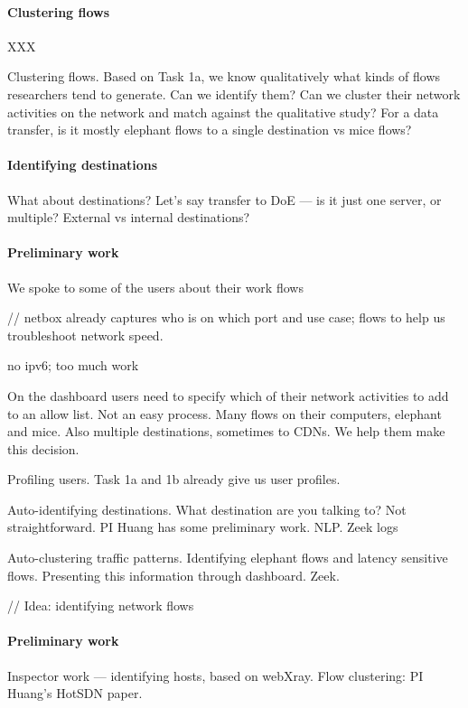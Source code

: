 \paragraph{Clustering flows} XXX

Clustering flows. Based on Task 1a, we know qualitatively what kinds of flows researchers tend to generate. Can we identify them? Can we cluster their network activities on the network and match against the qualitative study? For a data transfer, is it mostly elephant flows to a single destination vs mice flows?

\paragraph{Identifying destinations}
What about destinations? Let's say transfer to DoE — is it just one server, or multiple? External vs internal destinations?

\paragraph{Preliminary work} We spoke to some of the users about their work flows

// netbox already captures who is on which port and use case; flows to help us troubleshoot network speed.

no ipv6; too much work




On the dashboard users need to specify which of their network activities to add to an allow list. Not an easy process. Many flows on their computers, elephant and mice. Also multiple destinations, sometimes to CDNs. We help them make this decision.

Profiling users. Task 1a and 1b already give us user profiles.

Auto-identifying destinations. What destination are you talking to? Not straightforward. PI Huang has some preliminary work. NLP. Zeek logs

Auto-clustering traffic patterns. Identifying elephant flows and latency sensitive flows. Presenting this information through dashboard.  Zeek.

// Idea: identifying network flows

\paragraph{Preliminary work} Inspector work — identifying hosts, based on webXray. Flow clustering: PI Huang's HotSDN paper.

